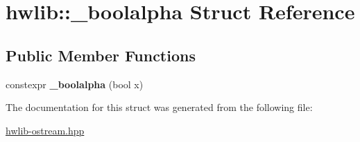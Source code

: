 \hypertarget{structhwlib_1_1__boolalpha}{}\section{hwlib\+:\+:\+\_\+boolalpha Struct Reference}
\label{structhwlib_1_1__boolalpha}
\subsection*{Public Member Functions}
\begin{DoxyCompactItemize}
\item 
constexpr {\bfseries \+\_\+boolalpha} (bool x)\hypertarget{structhwlib_1_1__boolalpha_a9972ce841479f54863b82332f82ed732}{}\label{structhwlib_1_1__boolalpha_a9972ce841479f54863b82332f82ed732}

\end{DoxyCompactItemize}


The documentation for this struct was generated from the following file\+:\begin{DoxyCompactItemize}
\item 
\hyperlink{hwlib-ostream_8hpp}{hwlib-\/ostream.\+hpp}\end{DoxyCompactItemize}
